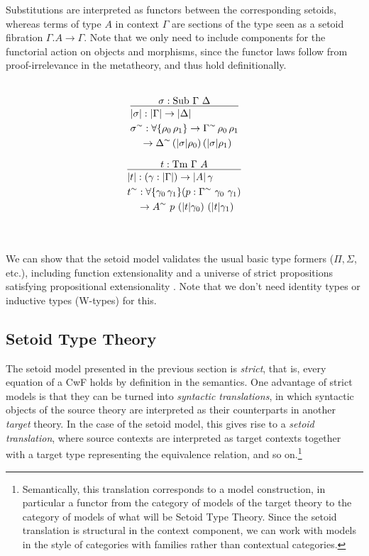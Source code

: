 \documentclass{easychair}
\newcommand{\GG}{\Gamma}
\newcommand{\GD}{\Delta}
\newcommand{\Tm}{\mathrm{Tm}}
\newcommand{\Sub}{\mathrm{Sub}}
\begin{document}
Substitutions are interpreted as functors between the corresponding setoids,
whereas terms of type $A$ in context $\GG$ are sections of the type seen as a
setoid fibration $\GG . A \to \GG$. Note that we only need to include components
for the functorial action on objects and morphisms, since the functor laws
follow from proof-irrelevance in the metatheory, and thus hold definitionally.
\\
~
\\
\begin{minipage}{0.5\textwidth}
\[
\infer{
  \begin{aligned}
    & | \sigma | : | \GG | \to | \GD | \\
    & \sigma^\sim : \forall\{\rho_0\, \rho_1\} \to \GG^\sim\, \rho_0\, \rho_1 \\
    & \quad \to \GD^\sim\, (|\sigma|\rho_0)\, (|\sigma|\rho_1)
  \end{aligned}
}{
  \sigma : \Sub\ \GG\ \GD
}
\]
\end{minipage}
\begin{minipage}{0.5\textwidth}
\[
\infer{
  \begin{aligned}
    & | t | : (\gamma : | \GG |) \to | A | \, \gamma \\
    & t^\sim : \forall\{\gamma_0\, \gamma_1\}
    (p : \GG^\sim\ \gamma_0\ \gamma_1) \\
    & \quad \to A^\sim\ p\ (|t|\gamma_0)\ (|t|\gamma_1)
  \end{aligned}
}{
  t : \Tm\ \GG\ A
}
\]
\end{minipage}
\\
~
\\
We can show that the setoid model validates the usual basic type formers ($\Pi,
\Sigma$, etc.), including function extensionality and a universe of strict
propositions satisfying propositional extensionality \cite{setoid99}. Note that
we don't need identity types or inductive types (W-types) for this.

\subsection{Setoid Type Theory}\label{sett}

The setoid model presented in the previous section is \emph{strict}, that is,
every equation of a CwF holds by definition in the semantics. One advantage of
strict models is that they can be turned into \emph{syntactic translations}, in
which syntactic objects of the source theory are interpreted as their
counterparts in another \emph{target} theory. In the case of the setoid model,
this gives rise to a \emph{setoid translation}, where source contexts are
interpreted as target contexts together with a target type representing the
equivalence relation, and so on.\footnote{%
Semantically, this translation corresponds to a model construction, in
particular a functor from the category of models of the target theory to the
category of models of what will be Setoid Type Theory.  Since the setoid
translation is structural in the context component, we can work with models in
the style of categories with families rather than contextual categories.
}
\end{document}
